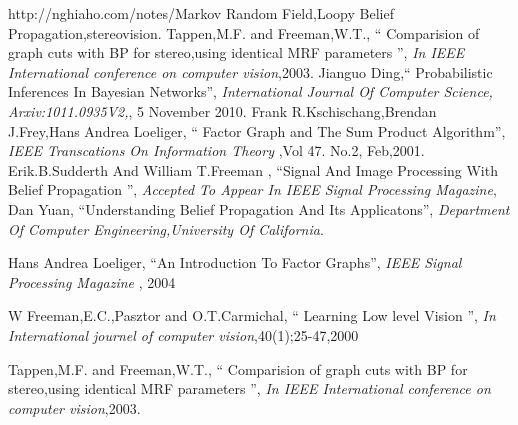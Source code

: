 \begin{thebibliography}{1}
 http://nghiaho.com/notes/Markov Random Field,Loopy Belief Propagation,stereovision.
 Tappen,M.F. and Freeman,W.T., `` Comparision of graph cuts with BP for stereo,using identical MRF parameters '', \emph{In IEEE International conference on computer vision},2003.
 Jianguo Ding,`` Probabilistic Inferences In Bayesian Networks'', \emph{International Journal Of Computer Science, Arxiv:1011.0935V2,}, 5 November 2010.
 Frank R.Kschischang,Brendan J.Frey,Hans Andrea Loeliger, `` Factor Graph and The Sum Product Algorithm'', \emph{IEEE Transcations On Information Theory} ,Vol 47. No.2, Feb,2001.
 Erik.B.Sudderth And William T.Freeman , ``Signal And Image Processing With Belief Propagation '', \emph{Accepted To Appear In IEEE Signal Processing Magazine},
 Dan Yuan, ``Understanding Belief Propagation And Its Applicatons'', \emph{Department Of Computer Engineering,University Of California}.

 Hans Andrea Loeliger, ``An Introduction To Factor Graphs'', \emph{IEEE Signal Processing Magazine }, 2004


W Freeman,E.C.,Pasztor and O.T.Carmichal, `` Learning Low level Vision '', \emph{In International  journel of computer vision},40(1);25-47,2000

Tappen,M.F. and Freeman,W.T., `` Comparision of graph cuts with BP for stereo,using identical MRF parameters '', \emph{In IEEE International conference on computer vision},2003.




\end{thebibliography}
